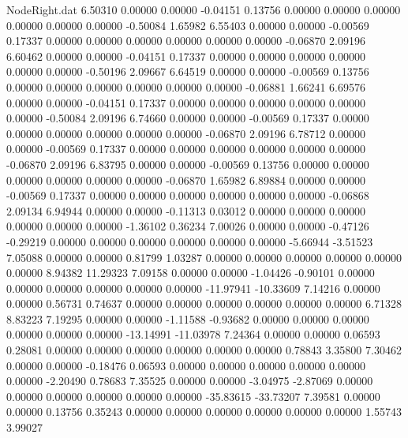 \begin{filecontents}{NodeRight.dat}
   6.50310    0.00000    0.00000    -0.04151    0.13756    0.00000    0.00000    0.00000    0.00000    0.00000    0.00000   -0.50084    1.65982
   6.55403    0.00000    0.00000    -0.00569    0.17337    0.00000    0.00000    0.00000    0.00000    0.00000    0.00000   -0.06870    2.09196
   6.60462    0.00000    0.00000    -0.04151    0.17337    0.00000    0.00000    0.00000    0.00000    0.00000    0.00000   -0.50196    2.09667
   6.64519    0.00000    0.00000    -0.00569    0.13756    0.00000    0.00000    0.00000    0.00000    0.00000    0.00000   -0.06881    1.66241
   6.69576    0.00000    0.00000    -0.04151    0.17337    0.00000    0.00000    0.00000    0.00000    0.00000    0.00000   -0.50084    2.09196
   6.74660    0.00000    0.00000    -0.00569    0.17337    0.00000    0.00000    0.00000    0.00000    0.00000    0.00000   -0.06870    2.09196
   6.78712    0.00000    0.00000    -0.00569    0.17337    0.00000    0.00000    0.00000    0.00000    0.00000    0.00000   -0.06870    2.09196
   6.83795    0.00000    0.00000    -0.00569    0.13756    0.00000    0.00000    0.00000    0.00000    0.00000    0.00000   -0.06870    1.65982
   6.89884    0.00000    0.00000    -0.00569    0.17337    0.00000    0.00000    0.00000    0.00000    0.00000    0.00000   -0.06868    2.09134
   6.94944    0.00000    0.00000    -0.11313    0.03012    0.00000    0.00000    0.00000    0.00000    0.00000    0.00000   -1.36102    0.36234
   7.00026    0.00000    0.00000    -0.47126   -0.29219    0.00000    0.00000    0.00000    0.00000    0.00000    0.00000   -5.66944   -3.51523
   7.05088    0.00000    0.00000     0.81799    1.03287    0.00000    0.00000    0.00000    0.00000    0.00000    0.00000    8.94382   11.29323
   7.09158    0.00000    0.00000    -1.04426   -0.90101    0.00000    0.00000    0.00000    0.00000    0.00000    0.00000  -11.97941  -10.33609
   7.14216    0.00000    0.00000     0.56731    0.74637    0.00000    0.00000    0.00000    0.00000    0.00000    0.00000    6.71328    8.83223
   7.19295    0.00000    0.00000    -1.11588   -0.93682    0.00000    0.00000    0.00000    0.00000    0.00000    0.00000  -13.14991  -11.03978
   7.24364    0.00000    0.00000     0.06593    0.28081    0.00000    0.00000    0.00000    0.00000    0.00000    0.00000    0.78843    3.35800
   7.30462    0.00000    0.00000    -0.18476    0.06593    0.00000    0.00000    0.00000    0.00000    0.00000    0.00000   -2.20490    0.78683
   7.35525    0.00000    0.00000    -3.04975   -2.87069    0.00000    0.00000    0.00000    0.00000    0.00000    0.00000  -35.83615  -33.73207
   7.39581    0.00000    0.00000     0.13756    0.35243    0.00000    0.00000    0.00000    0.00000    0.00000    0.00000    1.55743    3.99027

\end{filecontents}

